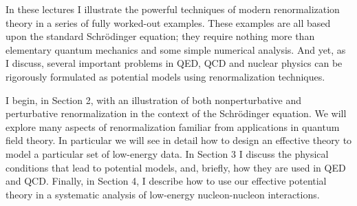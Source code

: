 \documentclass[cs4size,titlepage,twoside]{ctexart}
\begin{document}
\begin{appendices}
In these lectures I illustrate the powerful techniques of modern renormalization
theory in a series of fully worked-out examples. These examples are all
based upon the standard Schr\"odinger equation; they require nothing more than
elementary quantum mechanics and some simple numerical analysis. And yet,
as I discuss, several important problems in QED, QCD and nuclear physics can
be rigorously formulated as potential models using renormalization techniques.

I begin, in Section 2, with an illustration of both nonperturbative and perturbative
renormalization in the context of the Schr\"odinger equation. We will
explore many aspects of renormalization familiar from applications in quantum
field theory. In particular we will see in detail how to design an effective
theory to model a particular set of low-energy data. In Section 3 I discuss the
physical conditions that lead to potential models, and, briefly, how they are
used in QED and QCD. Finally, in Section 4, I describe how to use our effective
potential theory in a systematic analysis of low-energy nucleon-nucleon
interactions.

\end{appendices}
\cleardoublepage
\end{document}
